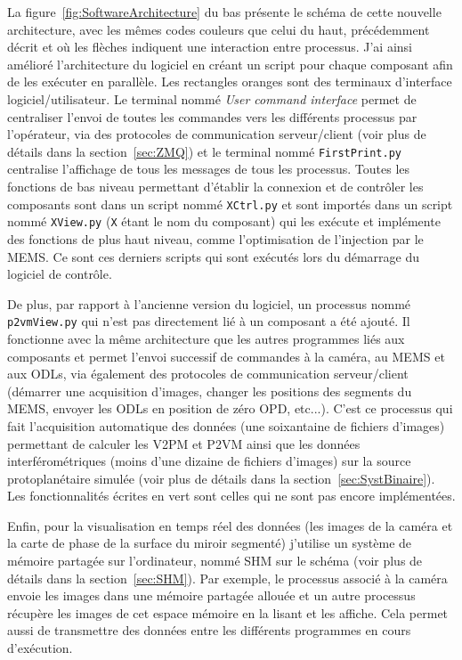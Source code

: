 La figure~\ref{fig:SoftwareArchitecture} du bas présente le schéma de cette nouvelle architecture, avec les mêmes codes couleurs que celui du haut, précédemment décrit et où les flèches indiquent une interaction entre processus. J'ai ainsi amélioré l'architecture du logiciel en créant un script pour chaque composant afin de les exécuter en parallèle. Les rectangles oranges sont des terminaux d'interface logiciel/utilisateur. Le terminal nommé \textit{User command interface} permet de centraliser l'envoi de toutes les commandes vers les différents processus par l'opérateur, via des protocoles de communication serveur/client (voir plus de détails dans la section~\ref{sec:ZMQ}) et le terminal nommé \texttt{FirstPrint.py} centralise l'affichage de tous les messages de tous les processus. Toutes les fonctions de bas niveau permettant d'établir la connexion et de contrôler les composants sont dans un script nommé \texttt{XCtrl.py} et sont importés dans un script nommé \texttt{XView.py} (\texttt{X} étant le nom du composant) qui les exécute et implémente des fonctions de plus haut niveau, comme l'optimisation de l'injection par le \ac{MEMS}. Ce sont ces derniers scripts qui sont exécutés lors du démarrage du logiciel de contrôle.

De plus, par rapport à l'ancienne version du logiciel, un processus nommé \texttt{p2vmView.py} qui n'est pas directement lié à un composant a été ajouté. Il fonctionne avec la même architecture que les autres programmes liés aux composants et permet l'envoi successif de commandes à la caméra, au \ac{MEMS} et aux \ac{ODL}s, via également des protocoles de communication serveur/client (démarrer une acquisition d'images, changer les positions des segments du \ac{MEMS}, envoyer les \ac{ODL}s en position de zéro \ac{OPD}, etc...). C'est ce processus qui fait l'acquisition automatique des données (une soixantaine de fichiers d'images) permettant de calculer les \ac{V2PM} et \ac{P2VM} ainsi que les données interférométriques (moins d'une dizaine de fichiers d'images) sur la source protoplanétaire simulée (voir plus de détails dans la section~\ref{sec:SystBinaire}). Les fonctionnalités écrites en vert sont celles qui ne sont pas encore implémentées.

Enfin, pour la visualisation en temps réel des données (les images de la caméra et la carte de phase de la surface du miroir segmenté) j'utilise un système de mémoire partagée sur l'ordinateur, nommé \ac{SHM} sur le schéma (voir plus de détails dans la section~\ref{sec:SHM}). Par exemple, le processus associé à la caméra envoie les images dans une mémoire partagée allouée et un autre processus récupère les images de cet espace mémoire en la lisant et les affiche. Cela permet aussi de transmettre des données entre les différents programmes en cours d'exécution.

